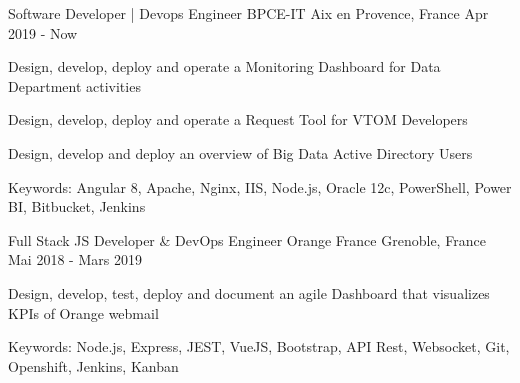 \begin{cventries}
  \cventry
    {Software Developer | Devops Engineer} %
    {BPCE-IT} %
    {Aix en Provence, France} %
    {Apr 2019 - Now} %
    {
      \begin{cvitems} %
        \item {Design, develop, deploy and operate a Monitoring Dashboard for Data Department activities  }
        \item {Design, develop, deploy and operate a Request Tool for VTOM Developers}
        \item {Design, develop and deploy  an overview of Big Data Active Directory Users}
        \item {Keywords: Angular 8, Apache, Nginx, IIS, Node.js, Oracle 12c, PowerShell, Power BI, Bitbucket, Jenkins}
      \end{cvitems}
    }

  \cventry
    {Full Stack JS Developer \& DevOps Engineer} %
    {Orange France} %
    {Grenoble, France} %
    {Mai 2018 - Mars 2019} %
    {
      \begin{cvitems} %
        \item {Design, develop, test, deploy and document an agile Dashboard that visualizes KPIs of Orange webmail}
        \item {Keywords: Node.js, Express, JEST, VueJS, Bootstrap, API Rest, Websocket, Git, Openshift, Jenkins, Kanban}
      \end{cvitems}
    }

\end{cventries}
